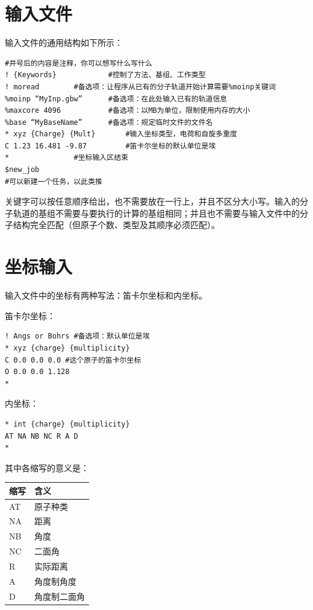 \documentclass{ctexart}
\begin{document}
	\section{输入文件}
	输入文件的通用结构如下所示：
	
	\begin{lstlisting}
#井号后的内容是注释，你可以想写什么写什么
! {Keywords} 			#控制了方法、基组、工作类型
! moread 		#备选项：让程序从已有的分子轨道开始计算需要%moinp关键词
%moinp “MyInp.gbw” 		#备选项：在此处输入已有的轨道信息
%maxcore 4096 			#备选项：以MB为单位，限制使用内存的大小
%base “MyBaseName” 		#备选项：规定临时文件的文件名
* xyz {Charge} {Mult} 		#输入坐标类型，电荷和自旋多重度
C 1.23 16.481 -9.87 		#笛卡尔坐标的默认单位是埃
* 				#坐标输入区结束
$new_job
#可以新建一个任务，以此类推
	\end{lstlisting}
	
	关键字可以按任意顺序给出，也不需要放在一行上，并且不区分大小写。输入的分子轨道的基组不需要与要执行的计算的基组相同；并且也不需要与输入文件中的分子结构完全匹配（但原子个数、类型及其顺序必须匹配）。
	
	\section{坐标输入}
	输入文件中的坐标有两种写法：笛卡尔坐标和内坐标。
	
	笛卡尔坐标：
	\begin{lstlisting}
! Angs or Bohrs #备选项：默认单位是埃
* xyz {charge} {multiplicity}
C 0.0 0.0 0.0 #这个原子的笛卡尔坐标
O 0.0 0.0 1.128
*
	\end{lstlisting}
	
	内坐标：
	\begin{lstlisting}
* int {charge} {multiplicity}
AT NA NB NC R A D 
*
	\end{lstlisting}
	
	其中各缩写的意义是：
	
\begin{table}[H]
	\centering
	\begin{tabular}{ll}
		\toprule
		\textbf{缩写} & \textbf{含义}     \\
		\midrule
		AT & 原子种类   \\
		NA & 距离     \\
		NB & 角度     \\
		NC & 二面角    \\
		R  & 实际距离   \\
		A  & 角度制角度  \\
		D  & 角度制二面角\\
		\bottomrule
	\end{tabular}
\end{table}
	
\end{document}
